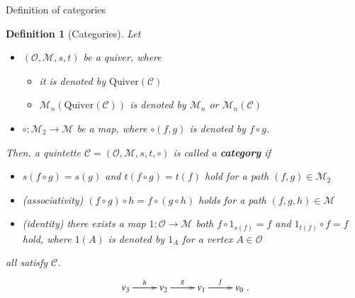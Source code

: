 \documentclass[dvipdfmx,10pt,notheorems]{beamer}
\newtheorem{definition}[theorem]{Definition}
\renewcommand{\#}{^\sharp}
\begin{document}
	\begin{frame}{Definition of categories}
			\begin{definition}[Categories]
							Let
									\begin{itemize}
											\item $(\mathcal{O},\mathcal{M},s,t)$ be a quiver,
											where
													\begin{itemize}
															\item it is denoted by $\mathrm{Quiver}(\mathcal{C})$
															\item
															$\mathcal{M}_n(\mathrm{Quiver}(\mathcal{C}))$
															is denoted
															by $\mathcal{M}_n$ or $\mathcal{M}_n(\mathcal{C})$
													\end{itemize}											
											\item $\circ:\mathcal{M}_2\rightarrow\mathcal{M}$ be a map, where
											$\circ(f,g)$ is denoted by $f\circ g$.
									\end{itemize}
							 Then, a quintette $\mathcal{C}=(\mathcal{O},\mathcal{M},s,t,\circ)$ is called a {\bf category} if
									\begin{itemize}
										\item $s(f\circ g)=s(g)$ and $t(f\circ g)=t(f)$ hold for a path $(f,g)\in\mathcal{M}_2$
										\item (associativity) $(f\circ g)\circ h=f\circ (g\circ h)$ holds for a path $(f,g,h)\in\mathcal{M}$
										\item (identity) there exists a map $1:\mathcal{O}\rightarrow\mathcal{M}$
										both $f\circ 1_{s(f)}=f$ and $1_{t(f)}\circ f=f$ hold, where $1(A)$ is denoted by
										$1_A$ for a vertex $A\in\mathcal{O}$
									\end{itemize}
					all satisfy $\mathcal{C}$.
					\begin{equation*}
									\begin{gathered}
															\xymatrix{
															v_3
															\ar[r]^{h}
															&
															v_2
															\ar[r]^{g}
															&
															v_{1}
															\ar[r]^{f}
															&
															v_0
															}.
									\end{gathered}
					\end{equation*}
			\end{definition}
	\end{frame}
	
	
	
\end{document}
